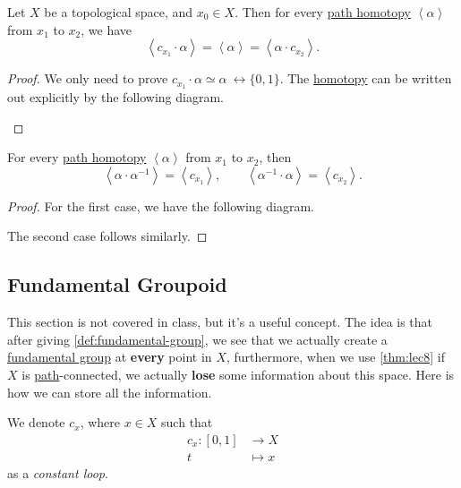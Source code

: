 \begin{lemma}\label{lma:lec8-3}
	Let \(X\) be a topological space, and \(x_0\in X\). Then for every \hyperref[def:homotopy-path]{path homotopy} \(\left< \alpha  \right> \) from
	\(x_1\) to \(x_2\), we have
	\[
		\left< c_{x_1}\cdot \alpha  \right> = \left< \alpha  \right> = \left< \alpha \cdot c_{x_2} \right>.
	\]
\end{lemma}
\begin{proof}
	We only need to prove \(c_{x_1}\cdot \alpha \simeq \alpha\ \rel \{0,1\} \). The \hyperref[def:homotopy]{homotopy} can be written out explicitly by the following diagram.
	\begin{figure}[H]
		\centering
		\label{fig:pf:lma:lec8-3}
	\end{figure}
\end{proof}

\begin{lemma}\label{lma:lec8-4}
	For every \hyperref[def:homotopy-path]{path homotopy} \(\left< \alpha  \right> \) from \(x_1\) to \(x_2\), then
	\[
		\left< \alpha \cdot \alpha ^{-1}  \right> = \left< c_{x_1} \right>, \qquad \left< \alpha ^{-1} \cdot \alpha  \right> = \left< c_{x_2} \right>.
	\]
\end{lemma}
\begin{proof}
	For the first case, we have the following diagram.
	\begin{figure}[H]
		\centering
		\label{fig:pf:lma:lec8-4}
	\end{figure}
	The second case follows similarly.
\end{proof}

\subsection{Fundamental Groupoid}
This section is not covered in class, but it's a useful concept. The idea is that after giving \autoref{def:fundamental-group}, we see that we actually create a \hyperref[def:fundamental-group]{fundamental group}
at \textbf{every} point in \(X\), furthermore, when we use \autoref{thm:lec8} if \(X\) is \hyperref[def:path]{path}-connected, we actually \textbf{lose} some
information about this space. Here is how we can store all the information.

\begin{notation}\label{not:constant-loop}
	We denote \(c_x\), where \(x\in X\) such that
	\[
		\begin{split}
			c_{x}\colon [0, 1] & \to X     \\
			t                  & \mapsto x
		\end{split}
	\]
	as a \emph{constant loop}.
\end{notation}

